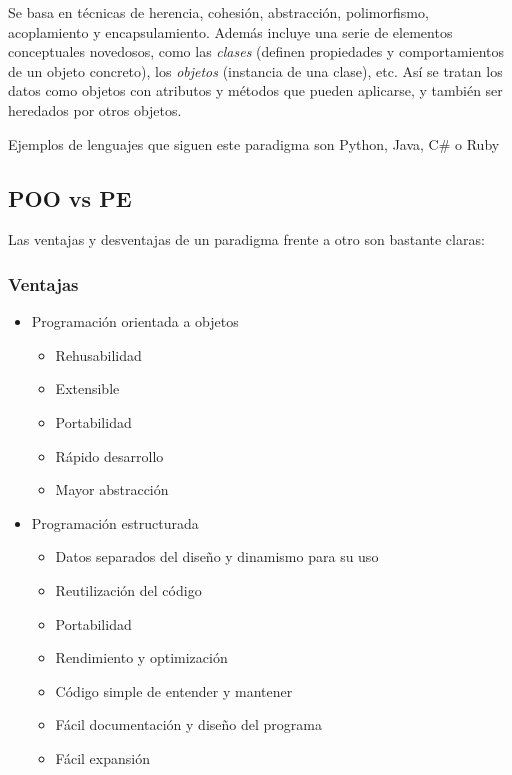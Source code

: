 \documentclass[a4paper, 11pt, titlepage]{article}
\begin{document}
    Se basa en técnicas de herencia, cohesión, abstracción, polimorfismo, acoplamiento y 
    encapsulamiento. Además incluye una serie de elementos conceptuales novedosos, como las \textit{clases}
    (definen propiedades y comportamientos de un objeto concreto), los \textit{objetos} 
    (instancia de una clase), etc. Así se tratan los datos como objetos con atributos y métodos que pueden 
    aplicarse, y también ser heredados por otros objetos.

    Ejemplos de lenguajes que siguen este paradigma son Python, Java, C\# o Ruby

    \subsection{POO vs PE}

    Las ventajas y desventajas de un paradigma frente a otro son bastante claras:

    \subsubsection{Ventajas}
    \begin{itemize}
        \item Programación orientada a objetos
        \begin{itemize}
            \item Rehusabilidad
            \item Extensible
            \item Portabilidad
            \item Rápido desarrollo
            \item Mayor abstracción        
        \end{itemize}
        \item Programación estructurada
        \begin{itemize}
            \item Datos separados del diseño y dinamismo para su uso
            \item Reutilización del código
            \item Portabilidad
            \item Rendimiento y optimización
            \item Código simple de entender y mantener
            \item Fácil documentación y diseño del programa
            \item Fácil expansión
        \end{itemize}
    \end{itemize}
\end{document}
